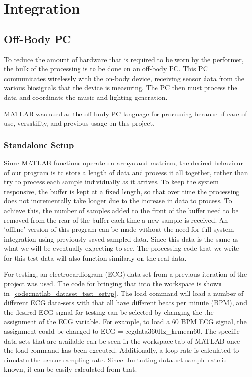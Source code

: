\chapter{Integration}
\section{Off-Body PC}
To reduce the amount of hardware that is required to be worn by the performer,
the bulk of the processing is to be done on an off-body PC.
This PC communicates wirelessly with the on-body device,
receiving sensor data from the various biosignals that the device is measuring.
The PC then must process the data and coordinate the music and lighting generation.

MATLAB was used as the off-body PC language for processing because of ease of use, versatility,
and previous usage on this project.

\subsection{Standalone Setup}
Since MATLAB functions operate on arrays and matrices,
the desired behaviour of our program is to store a length of data and process it all together,
rather than try to process each sample individually as it arrives.
To keep the system responsive, the buffer is kept at a fixed length,
so that over time the processing does not incrementally take longer due to the increase in data to process.
To achieve this, the number of samples added to the front of the buffer need to be removed from the rear of the buffer each time a new sample is received.
An `offline' version of this program can be made without the need for full system integration using previously saved sampled data.
Since this data is the same as what we will be eventually expecting to see,
The processing code that we write for this test data will also function similarly on the real data.

For testing, an electrocardiogram (ECG) data-set from a previous iteration of the project was used.
The code for bringing that into the workspace is shown in~\autoref{code:matlab_dataset_test_setup}.
The load command will load a number of different ECG data-sets with that all have different beats per minute (BPM),
and the desired ECG signal for testing can be selected by changing the the assignment of the ECG variable.
For example, to load a 60 BPM ECG signal, the assignment could be changed to ECG = ecgdata360Hz\_hrmean60.
The specific data-sets that are available can be seen in the workspace tab of MATLAB once the load command has been executed.
Additionally, a loop rate is calculated to simulate the sensor sampling rate.
Since the testing data-set sample rate is known, it can be easily calculated from that.

